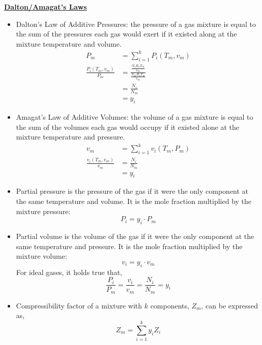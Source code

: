 \Large \textbf{{\color{red}\underline{Dalton/Amagat's Laws}}}

\begin{itemize}
    \item {\color{blue}Dalton's Law of Additive Pressures:} the {\color{red}pressure of a gas mixture} is {\color{red}equal} to the {\color{red}sum of the pressures each gas would exert} if it existed along at the {\color{red}mixture temperature and volume}.
    \begin{align*}
        P_m &= \sum_{i=1}^{k} P_i (T_m, v_m) \\
        \frac{P_i(T_m, v_m)}{P_m} &= \frac{\frac{N_i R_u T_m}{v_m}}{\frac{N_m R_u T_m}{v_m}} \\
        &= \frac{N_i}{N_m} \\
        &= y_i
    \end{align*}
    \item {\color{blue}Amagat's Law of Additive Volumes:} the {\color{red}volume of a gas mixture} is {\color{red}equal} to the {\color{red}sum of the volumes each gas would occupy} if it existed alone at the {\color{red}mixture temperature and pressure}.
    \begin{align*}
        v_m &= \sum_{i=1}^{k} v_i (T_m, P_m) \\
        \frac{v_i (T_m, v_m)}{v_m} &= \frac{N_i}{N_m} \\
        &= y_i
    \end{align*}
    \item {\color{blue}Partial pressure} is the pressure of the gas if it were the only component at the same temperature and volume. It is the mole fraction multiplied by the mixture pressure:
    \begin{equation*}
        P_i = y_i \cdot P_m
    \end{equation*}
    \item {\color{blue}Partial volume} is the volume of the gas if it were the only component at the same temperature and pressure. It is the mole fraction multiplied by the mixture volume:
    \begin{equation*}
        v_i = y_i \cdot v_m
    \end{equation*}
    For ideal gases, it holds true that,
    \begin{equation*}
        \frac{P_i}{P_m} = \frac{v_i}{v_m} = \frac{N_i}{N_m} = y_i
    \end{equation*}
    \item Compressibility factor of a mixture with $k$ components, $Z_m$, can be expressed as,
    \begin{equation*}
        Z_m = \sum_{i=1}^{k} y_i Z_i
    \end{equation*}
\end{itemize}

